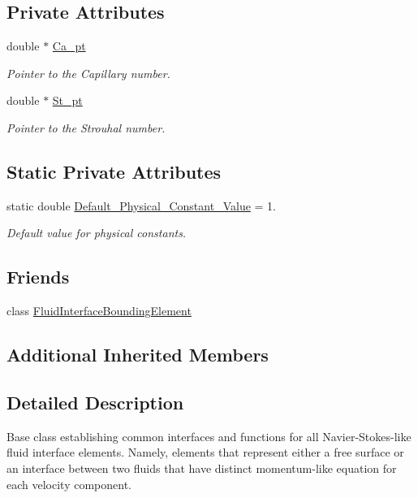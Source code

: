 \subsection*{Private Attributes}
\begin{DoxyCompactItemize}
\item 
double $\ast$ \hyperlink{classoomph_1_1FluidInterfaceElement_adaf6e3c6739fb9081f8865773a4d0c2c}{Ca\+\_\+pt}
\begin{DoxyCompactList}\small\item\em Pointer to the Capillary number. \end{DoxyCompactList}\item 
double $\ast$ \hyperlink{classoomph_1_1FluidInterfaceElement_ae32ade5ea1742938f538e5d5f812bb2a}{St\+\_\+pt}
\begin{DoxyCompactList}\small\item\em Pointer to the Strouhal number. \end{DoxyCompactList}\end{DoxyCompactItemize}
\subsection*{Static Private Attributes}
\begin{DoxyCompactItemize}
\item 
static double \hyperlink{classoomph_1_1FluidInterfaceElement_adbe9dc951b87449522f6d19e4acac538}{Default\+\_\+\+Physical\+\_\+\+Constant\+\_\+\+Value} = 1.
\begin{DoxyCompactList}\small\item\em Default value for physical constants. \end{DoxyCompactList}\end{DoxyCompactItemize}
\subsection*{Friends}
\begin{DoxyCompactItemize}
\item 
class \hyperlink{classoomph_1_1FluidInterfaceElement_af0eab9c2aa8fc5a5006df03ab93c015f}{Fluid\+Interface\+Bounding\+Element}
\end{DoxyCompactItemize}
\subsection*{Additional Inherited Members}


\subsection{Detailed Description}
Base class establishing common interfaces and functions for all Navier-\/\+Stokes-\/like fluid interface elements. Namely, elements that represent either a free surface or an interface between two fluids that have distinct momentum-\/like equation for each velocity component. 

